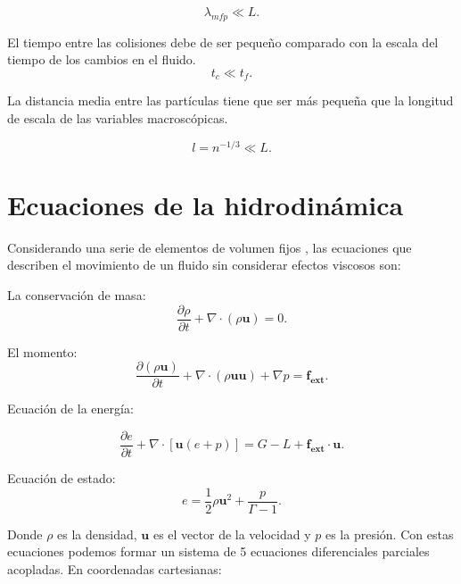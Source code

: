 \documentclass[12pt,a4paper]{book}
\begin{document}
\begin{equation}
\lambda_{mfp} \ll L.
\end{equation}

El tiempo entre las colisiones debe de ser pequeño comparado con la escala del tiempo de los cambios en el fluido.
\begin{equation}
t_{c} \ll t_f.
\end{equation}

La distancia media entre las partículas tiene que ser más pequeña que la longitud de escala de las variables macroscópicas.

\begin{equation}
l = n^{-1/3} \ll L.
\end{equation}



\section{Ecuaciones de la hidrodinámica}\label{sec:Ecuacioneshidrodinamica}

Considerando una serie de elementos de volumen fijos \citep{Clarke2007}, las ecuaciones que describen el movimiento de un fluido sin considerar efectos viscosos son:

La conservación de masa: 
\begin{equation} \label{conservación_masa_hidrodinamica}
\dfrac{\partial \rho }{\partial t} + \nabla \cdot \left( \rho \mathbf{u} \right)=0.
\end{equation}

El momento:
\begin{equation}  \label{conservacion_momento_hidrodinamica}
\dfrac{\partial \left( \rho \mathbf{u} \right) }{\partial t}+ \nabla \cdot \left( \rho \mathbf{u u} \right) + \nabla p = \mathbf{f_{ext}}.
\end{equation}

Ecuación de la energía:

\begin{equation} \label{conservacion_energia_hidrodinamica}
\dfrac{\partial e }{\partial t} + \nabla \cdot \left[ \mathbf{u} \left( e+p \right) \right] =G-L+\mathbf{f_{ext} \cdot \mathbf{u}}.
\end{equation}

Ecuación de estado:
\begin{equation}
e=\frac{1}{2} \rho \mathbf{u}^{2} + \frac{p}{\Gamma - 1}.
\end{equation}

Donde $\rho$ es la densidad, $\mathbf{u}$ es el vector de la velocidad y $p$ es la presión.
Con estas ecuaciones podemos formar un sistema de 5 ecuaciones diferenciales parciales acopladas. En coordenadas cartesianas:
\end{document}
